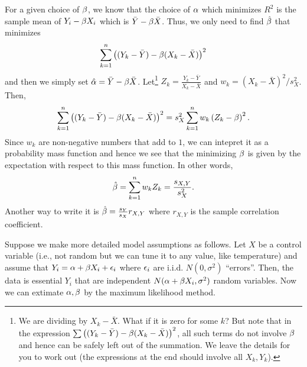 \documentclass[preprint,  11pt]{amsart}
\def\sig{{\sigma}}
\begin{document}
For a given choice of $\beta$, we know that the choice of $\alpha$ which minimizes $R^{2}$ is the sample mean of $Y_{i}-\beta X_{i}$ which is $\bar{Y}-\beta \bar{X}$. Thus, we only need to find $\hat{\beta}$ that minimizes
$$\sum_{k=1}^{n}\left((Y_{k}-\bar{Y})-\beta(X_{k}-\bar{X})\right)^{2}$$
and then we simply set $\hat{\alpha}=\bar{Y}-\beta\bar{X}$. Let\footnote{We are dividing by $X_{k}-\bar{X}$. What if it is zero for some $k$? But note that in the expression $\sum \left((Y_{k}-\bar{Y})-\beta(X_{k}-\bar{X})\right)^{2}$, all such terms do not involve $\beta$ and hence can be safely left out of the summation. We leave the details for you to work out (the expressions at the end should involve all $X_{k},Y_{k}$). } $Z_{k}=\frac{Y_{k}-\bar{Y}}{X_{k}-\bar{X}}$ and $w_{k}=(X_{k}-\bar{X})^{2}/s_{X}^{2}$. Then,
$$
\sum_{k=1}^{n}\left((Y_{k}-\bar{Y})-\beta(X_{k}-\bar{X})\right)^{2}=s_{X}^{2}\sum_{k=1}^{n}w_{k}\left(Z_{k}-\beta \right)^{2}.
$$
Since $w_{k}$ are non-negative numbers that add to $1$, we can intepret it as a probability mass function and hence we see that the minimizing $\beta$ is given by the expectation with respect to this mass function. In other words,
$$
\hat{\beta}=\sum_{k=1}^{n}w_{k}Z_{k} = \frac{s_{X,Y}}{s_{X}^{2}}.
$$
Another way to write it is $\hat{\beta}=\frac{s_{Y}}{s_{X}}r_{X,Y}$ where $r_{X,Y}$ is the sample correlation coefficient.

 Suppose we make more detailed model assumptions as follows. Let $X$ be a control variable (i.e., not random but we can tune it to any value, like temperature) and assume that $Y_{i}=\alpha+\beta X_{i}+\epsilon_{i}$ where $\epsilon_{i}$ are i.i.d. $N(0,\sig^{2})$ ``errors''. Then, the data is essential $Y_{i}$ that are independent $N(\alp+\bet X_{i},\sig^{2})$ random variables. Now we can extimate $\alpha,\beta$ by the maximum likelihood method.
\end{document}
